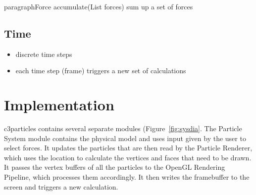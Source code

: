 \documentclass[runningheads,a4paper]{llncs}
\begin{document}
paragraph{Force accumulate(List forces)}
sum up a set of forces

\subsection{Time}
\begin{itemize}
\item discrete time steps
\item each time step (frame) triggers a new set of calculations
\end{itemize}


\section{Implementation}

c3particles contains several separate modules (Figure~\ref{fig:sysdia}. The Particle System module contains the physical model and uses input given by the user to select forces. It updates the particles that are then read by the Particle Renderer, which uses the location to calculate the vertices and faces that need to be drawn. It passes the vertex buffers of all the particles to the OpenGL Rendering Pipeline, which processes them accordingly. It then writes the framebuffer to the screen and triggers a new calculation.

\end{document}
